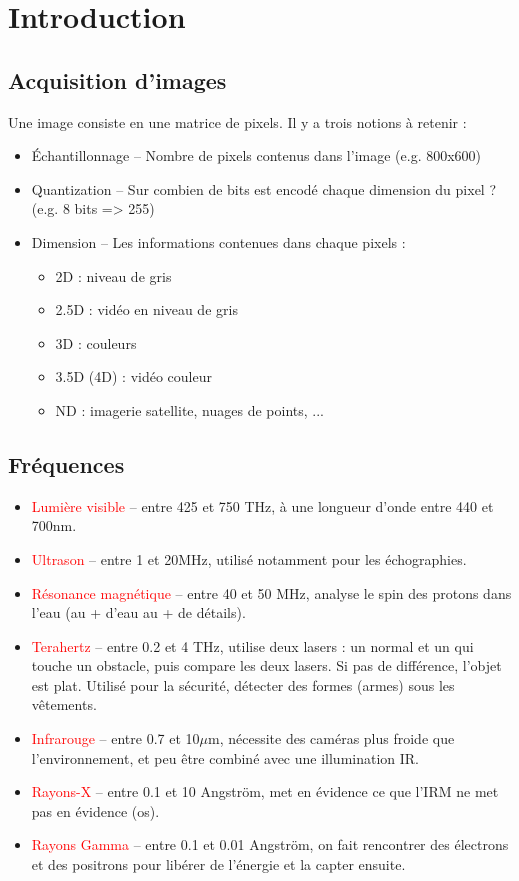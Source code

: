 \documentclass[letterpaper, 12pt]{article}
\newcommand{\alinea}{
\hspace*{0.5cm}}
\newcommand{\red}[1]{
	\textcolor{red}{#1}}
\begin{document}
\section{Introduction}
	\subsection{Acquisition d'images}
		\alinea Une image consiste en une matrice de pixels. Il y a trois notions à retenir : 
			\begin{itemize}
				\setlength\itemsep{0cm}
				\item \'Echantillonnage -- Nombre de pixels contenus dans l'image (e.g. 800x600)
				\item Quantization -- Sur combien de bits est encodé chaque dimension du pixel ? (e.g. 8 bits => 255)
				\item Dimension -- Les informations contenues dans chaque pixels : 
				\begin{itemize}
					\setlength\itemsep{0cm}
					\item 2D : niveau de gris
					\item 2.5D : vidéo en niveau de gris
					\item 3D : couleurs
					\item 3.5D (4D) : vidéo couleur
					\item ND : imagerie satellite, nuages de points, ...
				\end{itemize}
			\end{itemize}	
	\subsection{Fréquences}
		\begin{itemize}
			\setlength\itemsep{0cm}
			\item \red{Lumière visible} -- entre 425 et 750 THz, à une longueur d'onde entre 440 et 700nm.
			\item \red{Ultrason} -- entre 1 et 20MHz, utilisé notamment pour les échographies.
			\item \red{Résonance magnétique} -- entre 40 et 50 MHz, analyse le spin des protons dans l'eau (au + d'eau au + de détails).
			\item \red{Terahertz} -- entre 0.2 et 4 THz, utilise deux lasers : un normal et un qui touche un obstacle, puis 
				compare les deux lasers. Si pas de différence, l'objet est plat. Utilisé pour la sécurité, détecter des formes (armes)
				sous les vêtements.
			\item \red{Infrarouge} -- entre 0.7 et 10$\mu$m, nécessite des caméras plus froide que l'environnement, et peu être
				combiné avec une illumination IR.
			\item \red{Rayons-X} -- entre 0.1 et 10 Angström, met en évidence ce que l'IRM ne met pas en évidence (os).
			\item \red{Rayons Gamma} -- entre 0.1 et 0.01 Angström, on fait rencontrer des électrons et des positrons pour 
				libérer de l'énergie et la capter ensuite.
		\end{itemize}
\end{document}
